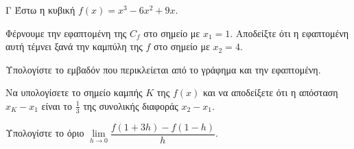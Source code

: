 \begin{thema}{Γ}
Έστω η κυβική $f(x) = x^3 - 6x^2 + 9x$.
\begin{erwthma}
  \item Φέρνουμε την εφαπτομένη της $C_f$ στο σημείο με $x_1 = 1$. Αποδείξτε ότι η εφαπτομένη αυτή τέμνει ξανά την καμπύλη της $f$ στο σημείο με $x_2 = 4$.
  \item Υπολογίστε το εμβαδόν που περικλείεται από το γράφημα και την εφαπτομένη.
  \item Να υπολογίσετε το σημείο καμπής $K$ της $f(x)$ και να αποδείξετε ότι η απόσταση $x_K - x_1$ είναι το $\frac{1}{3}$ της συνολικής διαφοράς $x_2 - x_1$.
  \item Υπολογίστε το όριο $\lim\limits_{h \to 0} \dfrac{f(1+3h) - f(1-h)}{h}$.
\end{erwthma}
\end{thema}
